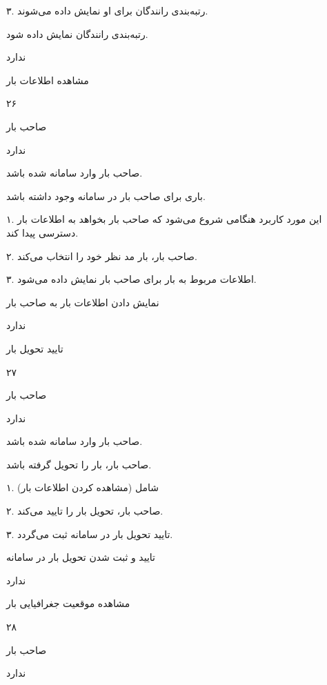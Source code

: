 ۳. رتبه‌بندی رانندگان برای او نمایش داده می‌شوند.

رتبه‌بندی رانندگان نمایش داده شود.

ندارد

\newpage

مشاهده اطلاعات بار

۲۶

صاحب بار

ندارد


صاحب بار وارد سامانه شده باشد.

باری برای صاحب بار در سامانه وجود داشته باشد.


۱. این مورد کاربرد هنگامی شروع می‌شود که صاحب بار بخواهد به اطلاعات بار دسترسی پیدا کند.

۲. صاحب بار، بار مد نظر خود را انتخاب می‌کند. 

۳. اطلاعات مربوط به بار برای صاحب بار نمایش داده می‌شود.

نمایش دادن اطلاعات بار به صاحب بار

ندارد

\newpage

تایید تحویل بار

۲۷

صاحب بار

ندارد


صاحب بار وارد سامانه شده باشد.

صاحب بار، بار را تحویل گرفته باشد.


۱. شامل (مشاهده کردن اطلاعات بار)

۲. صاحب بار، تحویل بار را تایید می‌کند.

۳. تایید تحویل بار در سامانه ثبت می‌گردد.

تایید و ثبت شدن تحویل بار در سامانه

ندارد

\newpage

مشاهده موقعیت جغرافیایی بار

۲۸

صاحب بار

ندارد


